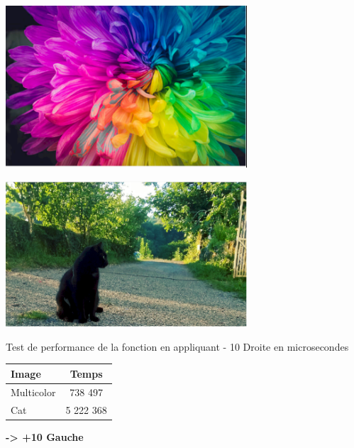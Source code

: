 \documentclass{article}
\begin{document}
\begin{center} 
    \includegraphics[width=9cm]{../Image_fonctions/Multicolor/Selected-10R.PNG}
\end{center}
\begin{center} 
    \includegraphics[width=9cm]{../Image_fonctions/Cat/Selected-10R.PNG}
\end{center}

\begin{center}
\medbreak
Test de performance de la fonction en appliquant - 10 Droite en microsecondes
\bigbreak
   \begin{tabular}{ | l | c | }
     \hline
     Image & Temps \\
     \hline
     Multicolor & 738 497 \\
     \hline
     Cat & 5 222 368 \\
     \hline
   \end{tabular}
 \end{center}
 
\bigbreak

\textbf{-> +10 Gauche}
\end{document}
